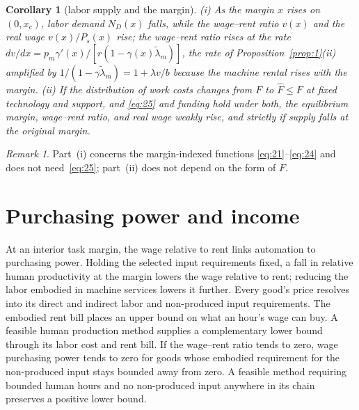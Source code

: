 \documentclass[12pt]{article}
\theoremstyle{plain}
\newtheorem{corollary}{Corollary}
\theoremstyle{definition}
\theoremstyle{remark}
\newtheorem*{remark}{Remark}
\begin{document}
\begin{corollary}[labor supply and the margin]\label{cor:statics}
(i) As the margin $x$ rises on $(0,x_c)$, labor demand $N_D(x)$ falls, while the wage--rent ratio $v(x)$ and the real wage $v(x)/P_s(x)$ rise; the wage--rent ratio rises at the rate $dv/dx=p_m\gamma'(x)/[r(1-\gamma(x)\widetilde\lambda_m)]$, the rate of Proposition~\ref{prop:1}(ii) amplified by $1/(1-\gamma\widetilde\lambda_m)=1+\lambda v/b$ because the machine rental rises with the margin.
(ii) If the distribution of work costs changes from $F$ to $\widehat F\le F$ at fixed technology and support, and \eqref{eq:25} and funding hold under both, the equilibrium margin, wage--rent ratio, and real wage weakly rise, and strictly if supply falls at the original margin.
\end{corollary}

\begin{remark}
Part~(i) concerns the margin-indexed functions \eqref{eq:21}--\eqref{eq:24} and does not need~\eqref{eq:25}; part~(ii) does not depend on the form of $F$.
\end{remark}

\section{Purchasing power and income}\label{sec:purchasing}

At an interior task margin, the wage relative to rent links automation to purchasing power. Holding the selected input requirements fixed, a fall in relative human productivity at the margin lowers the wage relative to rent; reducing the labor embodied in machine services lowers it further. Every good's price resolves into its direct and indirect labor and non-produced input requirements. The embodied rent bill places an upper bound on what an hour's wage can buy. A feasible human production method supplies a complementary lower bound through its labor cost and rent bill. If the wage--rent ratio tends to zero, wage purchasing power tends to zero for goods whose embodied requirement for the non-produced input stays bounded away from zero. A feasible method requiring bounded human hours and no non-produced input anywhere in its chain preserves a positive lower bound.
\end{document}
